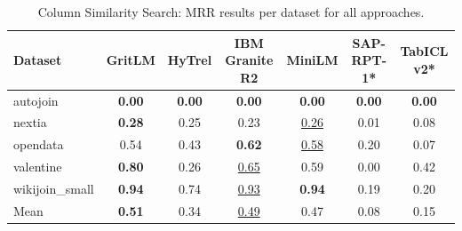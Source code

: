 \begin{table}[t]
\centering
\begin{tabular*}{\textwidth}{lcccccc}
\hline
Dataset & GritLM & HyTrel & IBM Granite R2 & MiniLM & SAP-RPT-1* & TabICL v2* \\
\hline
autojoin & \textbf{0.00} & \textbf{0.00} & \textbf{0.00} & \textbf{0.00} & \textbf{0.00} & \textbf{0.00} \\
nextia & \textbf{0.28} & 0.25 & 0.23 & \underline{0.26} & 0.01 & 0.08 \\
opendata & 0.54 & 0.43 & \textbf{0.62} & \underline{0.58} & 0.20 & 0.07 \\
valentine & \textbf{0.80} & 0.26 & \underline{0.65} & 0.59 & 0.00 & 0.42 \\
wikijoin_small & \textbf{0.94} & 0.74 & \underline{0.93} & \textbf{0.94} & 0.19 & 0.20 \\
Mean & \textbf{0.51} & 0.34 & \underline{0.49} & 0.47 & 0.08 & 0.15 \\
\hline
\end{tabular*}
\caption{Column Similarity Search: MRR results per dataset for all approaches.}
\label{tab:col_sim}
\end{table}
